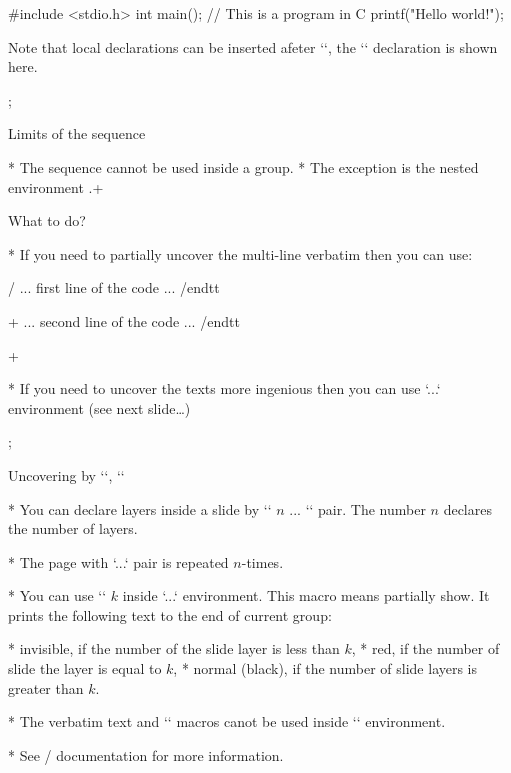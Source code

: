 \begtt {}
#include <stdio.h>
int main(); // This is a program in C
{
  printf("Hello world!\n");
}
\endtt

Note that local declarations can be inserted afeter `\begtt`, the
`\hisyntax` declaration is shown here.

\pg; %

\sec Limits of the \code{\\pg+} sequence

* The \code{\\pg+} sequence cannot be used inside a group.
* The exception is the nested environment .\pg+

\secc What to do?

* If you need to partially uncover the multi-line verbatim then you
   can use:

\begtt \adef/{\bslash}
\begtt
... first line of the code ...
/endtt 
\par\pg+ \vskip-6.75pt
\begtt
... second line of the code ...
/endtt
\endtt

\pg+


* If you need to uncover the texts more ingenious then you can
  use `\layers...\endlayers` environment (see next slide\dots)

\pg; %

\sec Uncovering by `\layers`, `\pshow`

* You can declare layers inside a slide by `\layers` $n$ ... `\endlayers` pair.
  The number $n$ declares the number of layers.

* The page with `\layers...\endlayers` pair is repeated $n$-times.

* You can use `\pshow` $k$ inside `\layers...\endlayers` environment.\nl
  This macro means partially show. It prints the following text to the end
  of current group:

\begitems
* invisible, if the number of the slide layer is less than $k$,
* red, if the number of slide the layer is equal to $k$,
* normal (black), if the number of slide layers is greater than $k$. 
\enditems

* The verbatim text and `\secc` macros canot be used inside 
  `\layer` environment.

* See \OpTeX/ documentation for more information.


